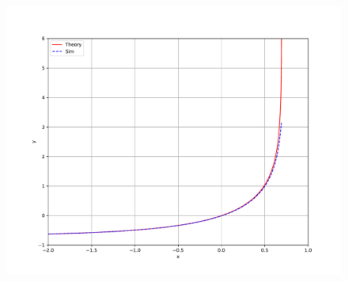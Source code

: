 \documentclass[journal]{IEEEtran}
\begin{document}
\begin{figure}[htbp]
  \centering
  \includegraphics[width=\columnwidth]{figs/curve.pdf}
\end{figure}
\end{document}
